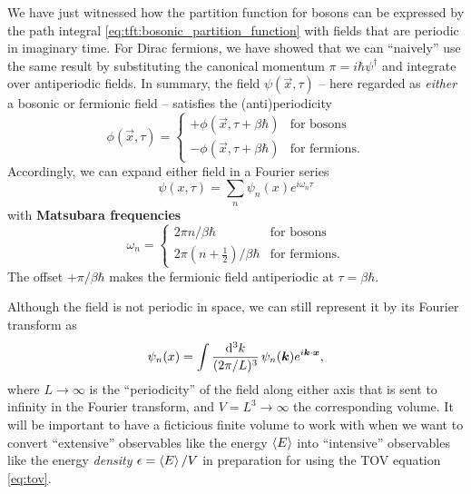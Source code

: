 We have just witnessed how the partition function for bosons can be expressed by the path integral \eqref{eq:tft:bosonic_partition_function} with fields that are periodic in imaginary time.
For Dirac fermions, we have showed that we can ``naively'' use the same result by substituting the canonical momentum $\pi = i \hbar \psi^\dagger$ and integrate over antiperiodic fields.
In summary, the field $\psi(\vec{x}, \tau)$ -- here regarded as \emph{either} a bosonic or fermionic field -- satisfies the (anti)periodicity
\begin{equation}
	\phi(\vec{x}, \tau) = \begin{cases}
						      + \phi(\vec{x}, \tau + \beta \hbar) & \text{for bosons} \\
						      - \phi(\vec{x}, \tau + \beta \hbar) & \text{for fermions} .
	                      \end{cases}
\label{eq:tft:periodicity}
\end{equation}
Accordingly, we can expand either field in a Fourier series
\begin{equation}
	\psi(x, \tau) = \sum_n \psi_n(x) e^{i \omega_n \tau}
\end{equation}
with \textbf{Matsubara frequencies} 
\begin{equation}
	\omega_n = \begin{cases}
			       2 \pi n / \beta \hbar    & \text{for bosons} \\
				   2 \pi (n+\frac12) / \beta \hbar & \text{for fermions} .
	           \end{cases}
\label{eq:tft:matsubara_frequencies}
\end{equation}
The offset $+\pi / \beta \hbar$ makes the fermionic field antiperiodic at $\tau = \beta \hbar$.

Although the field is not periodic in space, we can still represent it by its Fourier transform as
\begin{equation}
	\psi_n(x) = \int \frac{\mathop{}\!\mathrm{d}^3 k}{(2 \pi / L)^3} \, \psi_n({\bm{k}}) e^{i {\bm{k}} \cdot {\bm{x}}},
\label{eq:tft:mathematical_fourier_expansion}
\end{equation}
where $L \rightarrow \infty$ is the ``periodicity'' of the field along either axis that is sent to infinity in the Fourier transform, and $V = L^3 \rightarrow \infty$ the corresponding volume.
It will be important to have a ficticious finite volume to work with when we want to convert ``extensive'' observables like the energy $\left< E \right>$ into ``intensive'' observables like the energy \emph{density} $\epsilon = \left< E \right> / V$ in preparation for using the TOV equation \eqref{eq:tov}.

